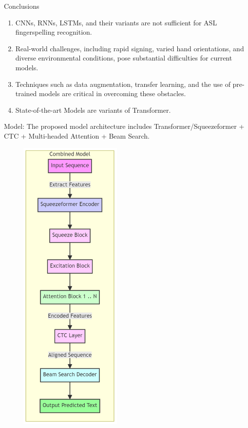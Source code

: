 \documentclass{beamer} %
\begin{document}
\begin{frame}[t]
\begin{columns}[t]
\begin{column}{0.3\textwidth}
			\begin{block}{Conclusions}
				\begin{minipage}{0.75\linewidth}
					\begin{enumerate}
						\item CNNs, RNNs, LSTMs, and their variants are not sufficient for ASL fingerspelling recognition.
						\item Real-world challenges, including rapid signing, varied hand orientations, and diverse environmental conditions, pose substantial difficulties for current models.
						\item Techniques such as data augmentation, transfer learning, and the use of pre-trained models are critical in overcoming these obstacles.
						\item State-of-the-art Models are variants of Transformer.
					\end{enumerate}
					\alert{Model}: The proposed model architecture includes Transformer/Squeezeformer + CTC + Multi-headed Attention + Beam Search.
				\end{minipage}
				\hfill
				\begin{minipage}{0.24\linewidth}
					\begin{figure}
						\includegraphics[width=2in]{mermaid-diagram-conclusion.png}
					\end{figure}
				\end{minipage}
			\end{block}


\end{column}
\end{columns}
\end{frame}
\end{document}
